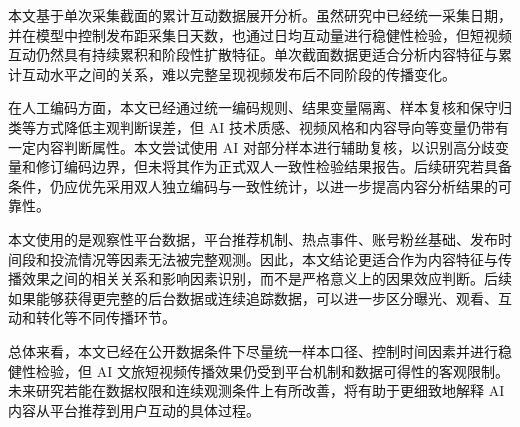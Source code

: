 本文基于单次采集截面的累计互动数据展开分析。虽然研究中已经统一采集日期，并在模型中控制发布距采集日天数，也通过日均互动量进行稳健性检验，但短视频互动仍然具有持续累积和阶段性扩散特征。单次截面数据更适合分析内容特征与累计互动水平之间的关系，难以完整呈现视频发布后不同阶段的传播变化。

在人工编码方面，本文已经通过统一编码规则、结果变量隔离、样本复核和保守归类等方式降低主观判断误差，但 AI 技术质感、视频风格和内容导向等变量仍带有一定内容判断属性。本文尝试使用 AI 对部分样本进行辅助复核，以识别高分歧变量和修订编码边界，但未将其作为正式双人一致性检验结果报告。后续研究若具备条件，仍应优先采用双人独立编码与一致性统计，以进一步提高内容分析结果的可靠性。

本文使用的是观察性平台数据，平台推荐机制、热点事件、账号粉丝基础、发布时间段和投流情况等因素无法被完整观测。因此，本文结论更适合作为内容特征与传播效果之间的相关关系和影响因素识别，而不是严格意义上的因果效应判断。后续如果能够获得更完整的后台数据或连续追踪数据，可以进一步区分曝光、观看、互动和转化等不同传播环节。

总体来看，本文已经在公开数据条件下尽量统一样本口径、控制时间因素并进行稳健性检验，但 AI 文旅短视频传播效果仍受到平台机制和数据可得性的客观限制。未来研究若能在数据权限和连续观测条件上有所改善，将有助于更细致地解释 AI 内容从平台推荐到用户互动的具体过程。
